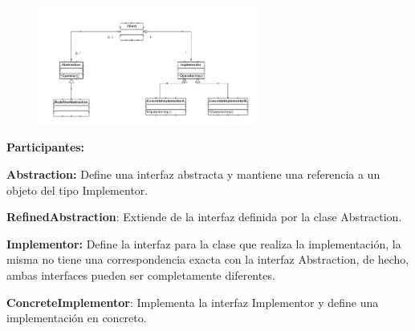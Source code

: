 \documentclass[12pt]{article}
\begin{document}
\begin{multicols}{2}

\begin{figure}[H]
	\begin{Center}
		\includegraphics[width=2.81in,height=1.54in]{./media/image9.png}
	\end{Center}
\end{figure}



\par

{\fontsize{9pt}{10.8pt}\selectfont \textbf{Participantes: }\par}\par


\vspace{\baselineskip}
{\fontsize{9pt}{10.8pt}\selectfont \textbf{Abstraction:} Define una interfaz abstracta y mantiene una referencia a un objeto del tipo Implementor. \par}\par


\vspace{\baselineskip}
{\fontsize{9pt}{10.8pt}\selectfont \textbf{RefinedAbstraction}: Extiende de la interfaz definida por la clase Abstraction. \par}\par


\vspace{\baselineskip}
{\fontsize{9pt}{10.8pt}\selectfont \textbf{Implementor:} Define la interfaz para la clase que realiza la implementación, la misma no tiene una correspondencia exacta con la interfaz Abstraction, de hecho, ambas interfaces pueden ser completamente diferentes. \par}\par


\vspace{\baselineskip}
{\fontsize{9pt}{10.8pt}\selectfont \textbf{ConcreteImplementor}: Implementa la interfaz Implementor y define una implementación en concreto.\par}\par



\end{multicols}
\end{document}
